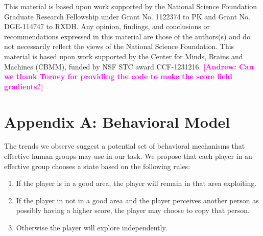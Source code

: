 \documentclass[12pt,letterpaper]{article}
\newcommand{\andrew}[1]{\textcolor{magenta}{\bf [Andrew: #1]}}
\begin{document}
\small

This material is based upon work supported by the National Science
Foundation Graduate Research Fellowship under Grant No. 1122374 to PK
and Grant No. DGE-114747 to RXDH. Any opinion, findings, and
conclusions or recommendations expressed in this material are those of
the authors(s) and do not necessarily reflect the views of the
National Science Foundation.  This material is based upon work
supported by the Center for Minds, Brains and Machines (CBMM), funded
by NSF STC award CCF-1231216.
\andrew{Can we thank Torney for providing the code to make the score field gradients?}




\setlength{\bibleftmargin}{.125in}
\setlength{\bibindent}{-\bibleftmargin}

\small{
  
}


\section*{Appendix A: Behavioral Model}

The trends we observe suggest a potential set of behavioral mechanisms
that effective human groups may use in our task.  We propose that each
player in an effective group chooses a state based on the following
rules:
\begin{enumerate}
\item
  If the player is in a good area, the player will remain in that area
  exploiting.
\item
  If the player in not in a good area and the player perceives another
  person as possibly having a higher score, the player may choose to
  copy that person.
\item
  Otherwise the player will explore independently.
\end{enumerate}
\end{document}
